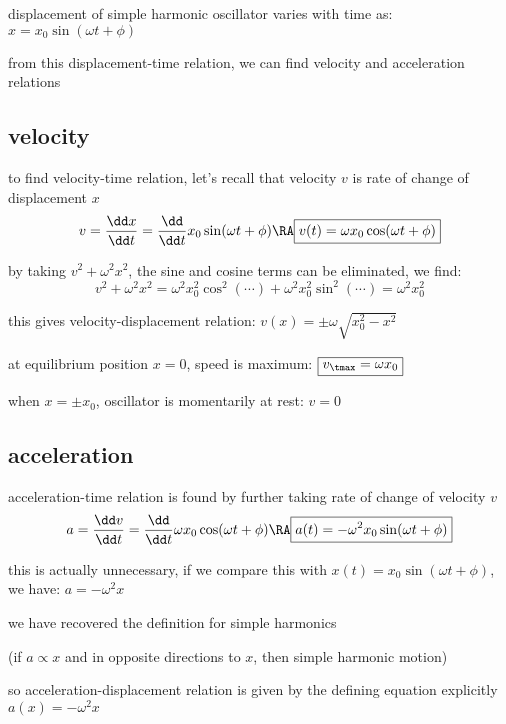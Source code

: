 displacement of simple harmonic oscillator varies with time as: $x=x_0\sin(\omega t + \phi)$

from this displacement-time relation, we can find velocity and acceleration relations

\subsection*{velocity}

to find velocity-time relation, let's recall that velocity $v$ is rate of change of displacement $x$
\begin{equation*}
	v = \frac{\dd x}{\dd t} = \frac{\dd}{\dd t} x_0\sin(\omega t+\phi) \RA \boxed{v(t) = \omega x_0 \cos(\omega t+\phi)}
\end{equation*}

by taking $v^2 + \omega^2 x^2$, the sine and cosine terms can be eliminated, we find:
\begin{equation*}
	v^2 + \omega^2 x^2 = \omega^2 x_0^2 \cos^2(\cdots) + \omega^2 x_0^2 \sin^2(\cdots) = \omega^2 x_0^2
\end{equation*}

this gives velocity-displacement relation: $\boxed{v(x)=\pm \omega\sqrt{x_0^2 - x^2}}$

\cmt at equilibrium position $x=0$, speed is maximum: $\boxed{v_\tmax = \omega x_0}$ 

\cmt when $x=\pm x_0$, oscillator is momentarily at rest: $v=0$ 

\subsection*{acceleration}

acceleration-time relation is found by further taking rate of change of velocity $v$
\begin{equation*}
a = \frac{\dd v}{\dd t} = \frac{\dd}{\dd t} \omega x_0 \cos(\omega t+\phi) \RA \boxed{a(t) = - \omega^2 x_0 \sin(\omega t+\phi)}
\end{equation*}

this is actually unnecessary, if we compare this with $x(t)=x_0 \sin(\omega t+\phi)$, we have: $a=-\omega^2 x$

we have recovered the definition for simple harmonics

(if $a \propto x$ and in opposite directions to $x$, then simple harmonic motion)

so acceleration-displacement relation is given by the defining equation explicitly $\boxed{a(x) = -\omega^2 x} $

